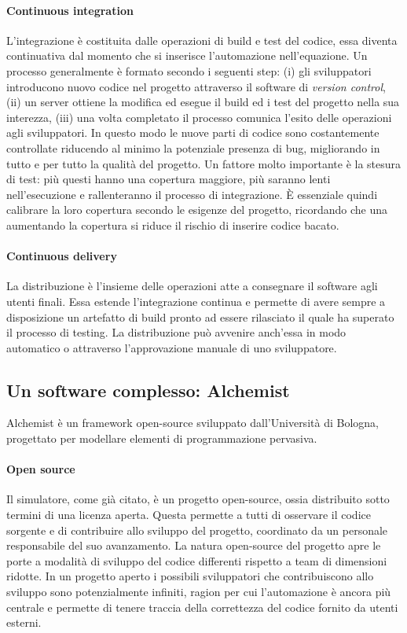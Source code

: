 \paragraph{Continuous integration} L'integrazione è costituita dalle operazioni di build e test del codice, essa diventa continuativa dal momento che si inserisce l'automazione nell'equazione. Un processo generalmente è formato secondo i seguenti step: (i) gli sviluppatori introducono nuovo codice nel progetto attraverso il software di \textit{version control}, (ii) un server ottiene la modifica ed esegue il build ed i test del progetto nella sua interezza, (iii) una volta completato il processo comunica l'esito delle operazioni agli sviluppatori. In questo modo le nuove parti di codice sono costantemente controllate riducendo al minimo la potenziale presenza di bug, migliorando in tutto e per tutto la qualità del progetto.
Un fattore molto importante è la stesura di test: più questi hanno una copertura maggiore, più saranno lenti nell'esecuzione e rallenteranno il processo di integrazione. È essenziale quindi calibrare la loro copertura secondo le esigenze del progetto, ricordando che una aumentando la copertura si riduce il rischio di inserire codice bacato.

\paragraph{Continuous delivery} La distribuzione è l'insieme delle operazioni atte a consegnare il software agli utenti finali. Essa estende l'integrazione continua e permette di avere sempre a disposizione un artefatto di build pronto ad essere rilasciato il quale ha superato il processo di testing. La distribuzione può avvenire anch'essa in modo automatico o attraverso l'approvazione manuale di uno sviluppatore. 

\subsection{Un software complesso: Alchemist}\label{sec:alchemist}
Alchemist\cite{Pianini_2013} è un framework open-source sviluppato dall'Università di Bologna, progettato per modellare elementi di programmazione pervasiva.

\paragraph{Open source}
Il simulatore, come già citato, è un progetto open-source, ossia distribuito sotto termini di una licenza aperta. Questa permette a tutti di osservare il codice sorgente e di contribuire allo sviluppo del progetto, coordinato da un personale responsabile del suo avanzamento. La natura open-source del progetto apre le porte a modalità di sviluppo del codice differenti rispetto a team di dimensioni ridotte. In un progetto aperto i possibili sviluppatori che contribuiscono allo sviluppo sono potenzialmente infiniti, ragion per cui l'automazione è ancora più centrale e permette di tenere traccia della correttezza del codice fornito da utenti esterni. 

